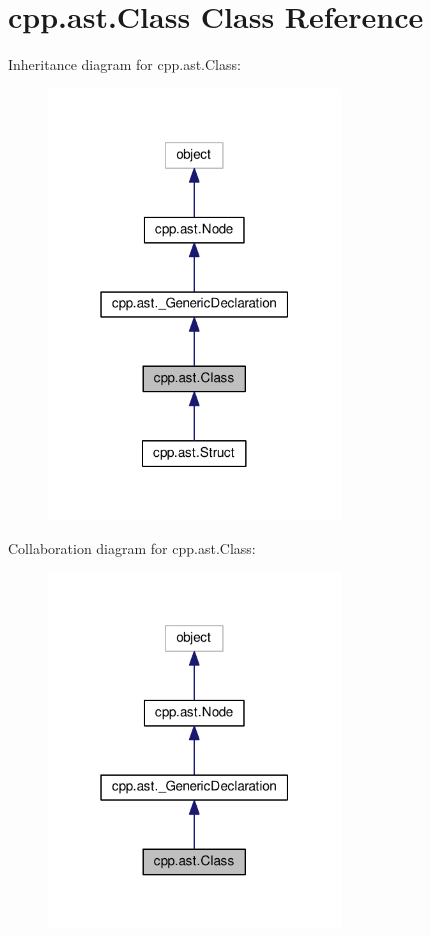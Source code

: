 \hypertarget{classcpp_1_1ast_1_1Class}{}\section{cpp.\+ast.\+Class Class Reference}
\label{classcpp_1_1ast_1_1Class}


Inheritance diagram for cpp.\+ast.\+Class\+:\nopagebreak
\begin{figure}[H]
\begin{center}
\leavevmode
\includegraphics[width=220pt]{classcpp_1_1ast_1_1Class__inherit__graph}
\end{center}
\end{figure}


Collaboration diagram for cpp.\+ast.\+Class\+:\nopagebreak
\begin{figure}[H]
\begin{center}
\leavevmode
\includegraphics[width=220pt]{classcpp_1_1ast_1_1Class__coll__graph}
\end{center}
\end{figure}
